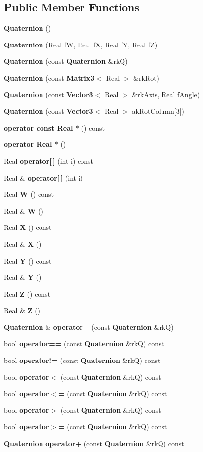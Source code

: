 \subsection*{Public Member Functions}
\begin{CompactItemize}
\item 
{\bf Quaternion} ()
\item 
{\bf Quaternion} (Real f\-W, Real f\-X, Real f\-Y, Real f\-Z)
\item 
{\bf Quaternion} (const {\bf Quaternion} \&rk\-Q)
\item 
{\bf Quaternion} (const {\bf Matrix3}$<$ Real $>$ \&rk\-Rot)
\item 
{\bf Quaternion} (const {\bf Vector3}$<$ Real $>$ \&rk\-Axis, Real f\-Angle)
\item 
{\bf Quaternion} (const {\bf Vector3}$<$ Real $>$ ak\-Rot\-Column[3])
\item 
{\bf operator const Real $\ast$} () const
\item 
{\bf operator Real $\ast$} ()
\item 
Real {\bf operator[$\,$]} (int i) const
\item 
Real \& {\bf operator[$\,$]} (int i)
\item 
Real {\bf W} () const
\item 
Real \& {\bf W} ()
\item 
Real {\bf X} () const
\item 
Real \& {\bf X} ()
\item 
Real {\bf Y} () const
\item 
Real \& {\bf Y} ()
\item 
Real {\bf Z} () const
\item 
Real \& {\bf Z} ()
\item 
{\bf Quaternion} \& {\bf operator=} (const {\bf Quaternion} \&rk\-Q)
\item 
bool {\bf operator==} (const {\bf Quaternion} \&rk\-Q) const
\item 
bool {\bf operator!=} (const {\bf Quaternion} \&rk\-Q) const
\item 
bool {\bf operator$<$} (const {\bf Quaternion} \&rk\-Q) const
\item 
bool {\bf operator$<$=} (const {\bf Quaternion} \&rk\-Q) const
\item 
bool {\bf operator$>$} (const {\bf Quaternion} \&rk\-Q) const
\item 
bool {\bf operator$>$=} (const {\bf Quaternion} \&rk\-Q) const
\item 
{\bf Quaternion} {\bf operator+} (const {\bf Quaternion} \&rk\-Q) const

\end{CompactItemize}
